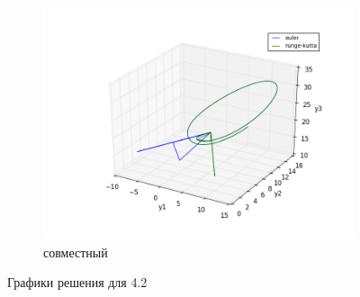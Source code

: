 \documentclass[oneside, final, 11pt]{article}
\begin{document}
\begin{figure}[h]
\begin{subfigure}[h]{1\textwidth}
        \includegraphics[width=\textwidth]{figure_4.png}
        \caption{совместный}
        \label{s2}
    \end{subfigure}
    \caption{Графики решения для 4.2}
\end{figure}
\end{document}
